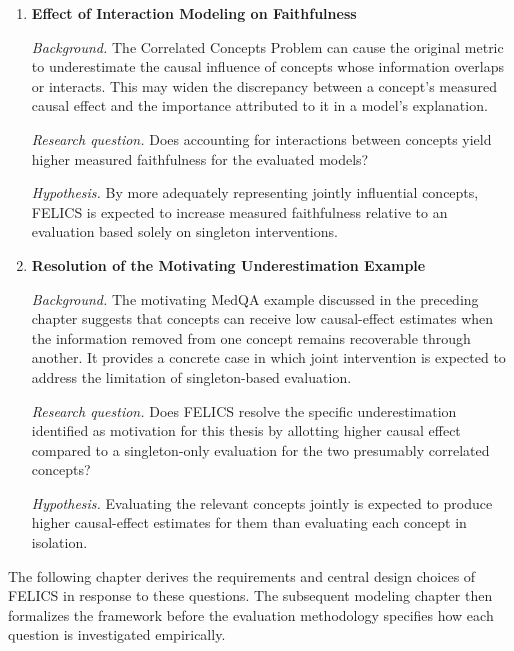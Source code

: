 \begin{enumerate}[
		label=\textbf{Q\arabic*},
		ref=Q\arabic*,
		wide=0pt,
		leftmargin=0pt
	]
	      \noindent\textit{Research question.}
	      Does the adjustment required to make causal effects from singleton and
	      joint interventions comparable preserve the within-question ranking of
	      concept-level causal effects?

	      \noindent\textit{Hypothesis.}
	      The adjustment is expected to affect the magnitudes of causal-effect
	      estimates without substantially changing which concepts are ranked as more
	      or less causally influential within a question.

	\item \label{rq:faithfulness_increase}
	      \textbf{Effect of Interaction Modeling on Faithfulness}

	      \noindent\textit{Background.}
	      The Correlated Concepts Problem can cause the original metric to
	      underestimate the causal influence of concepts whose information overlaps
	      or interacts. This may widen the discrepancy between a concept's measured
	      causal effect and the importance attributed to it in a model's explanation.

	      \noindent\textit{Research question.}
	      Does accounting for interactions between concepts yield higher measured
	      faithfulness for the evaluated models?

	      \noindent\textit{Hypothesis.}
	      By more adequately representing jointly influential concepts, FELICS is
	      expected to increase measured faithfulness relative to an evaluation based
	      solely on singleton interventions.

	\item \label{rq:motivating_example}
	      \textbf{Resolution of the Motivating Underestimation Example}

	      \noindent\textit{Background.}
	      The motivating MedQA example discussed in the preceding chapter suggests
	      that concepts can receive low causal-effect estimates when the information
	      removed from one concept remains recoverable through another. It provides a
	      concrete case in which joint intervention is expected to address the
	      limitation of singleton-based evaluation.

	      \noindent\textit{Research question.}
	      Does FELICS resolve the specific underestimation identified as motivation
	      for this thesis by allotting higher causal effect compared to a singleton-only evaluation for the two presumably correlated concepts?

	      \noindent\textit{Hypothesis.}
	      Evaluating the relevant concepts jointly is expected to produce higher
	      causal-effect estimates for them than evaluating each concept in isolation.

\end{enumerate}

The following chapter derives the requirements and central design choices of
FELICS in response to these questions. The subsequent modeling chapter then
formalizes the framework before the evaluation methodology specifies how each
question is investigated empirically.

